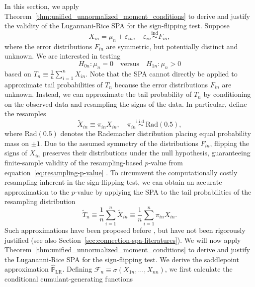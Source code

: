 \documentclass[12pt]{article}
\theoremstyle{definition}
\def\P{\mathbb{P}}
\def\P{\mathbb{P}}
\renewcommand{\P}{\mathbb{P}}							%
\newcommand{\iidsim}{\stackrel{\mathrm{i.i.d.}}{\sim}} 	%
\newcommand{\indsim}{\stackrel{\mathrm{ind}}{\sim}}		%
\begin{document}
In this section, we apply Theorem~\ref{thm:unified_unnormalized_moment_conditions} to derive and justify the validity of the Lugannani-Rice SPA for the sign-flipping test. Suppose
\begin{equation}
X_{in}=\mu_n+\varepsilon_{in}, \quad \varepsilon_{in} \indsim F_{in}, 
\label{eq:location-model-symmetric-errors}
\end{equation}
where the error distributions $F_{in}$ are symmetric, but potentially distinct and unknown. We are interested in testing 
\begin{equation}
H_{0n}:\mu_n=0 \quad \text{versus} \quad H_{1n}:\mu_n>0
\end{equation}
based on $T_n \equiv \frac{1}{n}\sum_{i=1}^n X_{in}$. Note that the SPA cannot directly be applied to approximate tail probabilities of $T_n$ because the error distributions $F_{in}$ are unknown. Instead, we can approximate the tail probability of $T_n$ by conditioning on the observed data and resampling the signs of the data. In particular, define the resamples
\begin{equation}
\widetilde X_{in} \equiv \pi_{in} X_{in}, \quad \pi_{in} \iidsim \text{Rad}(0.5),
\end{equation}
where $\text{Rad}(0.5)$ denotes the Rademacher distribution placing equal probability mass on $\pm 1$. Due to the assumed symmetry of the distributions $F_{in}$, flipping the signs of $X_{in}$ preserves their distributions under the null hypothesis, guaranteeing finite-sample validity of the resampling-based $p$-value from equation~\eqref{eq:resampling-p-value} \citep{Hemerik2018, Hemerik2019a}. To circumvent the computationally costly resampling inherent in the sign-flipping test, we can obtain an accurate approximation to the $p$-value by applying the SPA to the tail probabilities of the resampling distribution
\begin{equation}
\widetilde T_n \equiv \frac1n \sum_{i=1}^n \widetilde X_{in} \equiv \frac1n \sum_{i=1}^n \pi_{in} X_{in}.
\end{equation}
Such approximations have been proposed before \citep{Daniels1955, Robinson1982, Hinkley1988}, but have not been rigorously justified (see also Section~\ref{sec:connection-spa-literatures}). We will now apply Theorem~\ref{thm:unified_unnormalized_moment_conditions} to derive and justify the Lugananni-Rice SPA for the sign-flipping test. We derive the saddlepoint approximation $\widehat{\P}_\text{LR}$. Defining $\mathcal F_n \equiv \sigma(X_{1n}, \dots, X_{nn})$, we first calculate the conditional cumulant-generating functions
\end{document}
